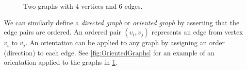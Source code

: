 \documentclass[12pt]{report}
\theoremstyle{definition}
\theoremstyle{upright}
\begin{document}
\begin{figure}[htbp]
\begin{center}
\begin{subfigure}[c]{0.45\linewidth}
\begin{center}
                
            \end{center}
            
        \end{subfigure}
    
    \end{center}

    \caption{Two graphs with $4$ vertices and $6$ edges.}\label{fig:Graphs}

\end{figure}

We can similarly define a \textit{directed graph} or \textit{oriented graph} by asserting that the edge pairs are ordered.
An ordered pair $(v_i, v_j)$ represents an edge from vertex $v_i$ to $v_j$.
An orientation can be applied to any graph by assigning an order (direction) to each edge.
See \cref{fig:OrientedGraphs} for an example of an orientation applied to the graphs in \cref{fig:Graphs}.
\end{document}
